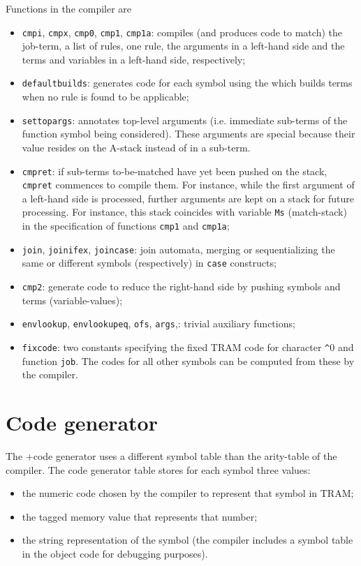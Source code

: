 \documentclass[11pt,twoside]{memoir}
\def\T{\texttt}
\begin{document}
Functions in the compiler are 
\begin{itemize}
	\item \T{cmpi}, \T{cmpx}, \T{cmp0}, \T{cmp1}, \T{cmp1a}: compiles (and produces code to match) the job-term, a list of rules, one rule, the arguments in a left-hand side and the terms and variables in a left-hand side, respectively;
	\item \T{defaultbuilds}: generates code for each symbol using the  which builds terms when no rule is found to be applicable;
	\item \T{settopargs}: annotates top-level arguments (i.e. immediate sub-terms of the function symbol being considered). These arguments are special because their value resides on the A-stack instead of in a sub-term.
	\item \T{cmpret}: if sub-terms to-be-matched have yet been pushed on the stack, \T{cmpret} commences to compile them. For instance, while the first argument of a left-hand side is processed, further arguments are kept on a stack for future processing. For instance, this stack coincides with variable \T{Ms} (match-stack) in the specification of functions \T{cmp1} and \T{cmp1a};
	\item \T{join}, \T{joinifex}, \T{joincase}: join automata, merging or sequentializing the same or different symbols (respectively) in \T{case} constructs;
	\item \T{cmp2}: generate code to reduce the right-hand side by pushing symbols and terms (variable-values);
	\item \T{envlookup}, \T{envlookupeq}, \T{ofs}, \T{args},: trivial auxiliary functions;
	\item \T{fixcode}: two constants specifying the fixed TRAM code for character \T\^{}0 and function \T{job}. The codes for all other symbols can be computed from these by the compiler.
\end{itemize}



\section{Code generator}
The +code generator uses a different symbol table than the arity-table of the compiler. The code generator table stores for each symbol three values: 
\begin{itemize}
	\item the numeric code chosen by the compiler to represent that symbol in TRAM;
	\item the tagged memory value that represents that number;
	\item the string representation of the symbol (the compiler includes a symbol table in the object code for debugging purposes).
\end{itemize}
\end{document}
